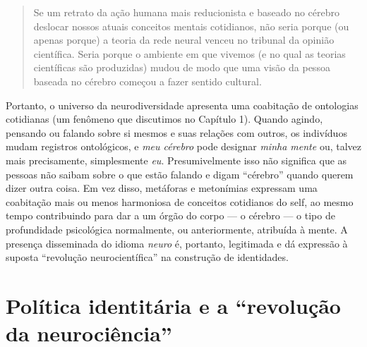 \begin{quote}
Se um retrato da ação humana mais reducionista e baseado no cérebro
deslocar nossos atuais conceitos mentais cotidianos, não seria porque
(ou apenas porque) a teoria da rede neural venceu no tribunal da opinião
científica. Seria porque o ambiente em que vivemos (e no qual as teorias
científicas são produzidas) mudou de modo que uma visão da pessoa
baseada no cérebro começou a fazer sentido cultural.
\end{quote}

Portanto, o universo da neurodiversidade apresenta uma coabitação de
ontologias cotidianas (um fenômeno que discutimos no Capítulo 1). Quando
agindo, pensando ou falando sobre si mesmos e suas relações com outros,
os indivíduos mudam registros ontológicos, e \emph{meu cérebro} pode
designar \emph{minha mente} ou, talvez mais precisamente, simplesmente
\emph{eu}. Presumivelmente isso não significa que as pessoas não saibam
sobre o que estão falando e digam ``cérebro'' quando querem dizer outra
coisa. Em vez disso, metáforas e metonímias expressam uma coabitação
mais ou menos harmoniosa de conceitos cotidianos do self, ao mesmo tempo
contribuindo para dar a um órgão do corpo --- o cérebro --- o tipo de
profundidade psicológica normalmente, ou anteriormente, atribuída à
mente. A presença disseminada do idioma \emph{neuro} é, portanto,
legitimada e dá expressão à suposta ``revolução neurocientífica'' na
construção de identidades.

\section*{Política identitária e a ``revolução da neurociência''}

